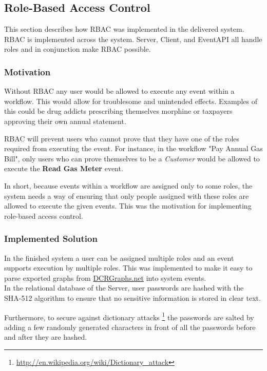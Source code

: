 \subsection{\label{sec:RBAC}Role-Based Access Control}
This section describes how RBAC was implemented in the delivered system. RBAC is implemented across the system. Server, Client, and EventAPI all handle roles and in conjunction make RBAC possible.

\subsubsection{Motivation}
Without RBAC any user would be allowed to execute any event within a workflow. This would allow for troublesome and unintended effects. Examples of this could be drug addicts prescribing themselves morphine or taxpayers approving their own annual statement. 

RBAC will prevent users who cannot prove that they have one of the roles required from executing the event. For instance, in the workflow "Pay Annual Gas Bill", only users who can prove themselves to be a \textit{Customer} would be allowed to execute the \textbf{Read Gas Meter} event.

In short, because events within a workflow are assigned only to some roles, the system needs a way of ensuring that only people assigned with these roles are allowed to execute the given events. This was the motivation for implementing role-based access control. 

\subsubsection{Implemented Solution}
In the finished system a user can be assigned multiple roles and an event supports execution by multiple roles. This was implemented to make it easy to parse exported graphs from \url{DCRGraphs.net} into system events. \\

In the relational database of the Server, user passwords are hashed with the SHA-512 algorithm to ensure that no sensitive information is stored in clear text. 

Furthermore, to secure against dictionary attacks \footnote{\url{http://en.wikipedia.org/wiki/Dictionary_attack}} the passwords are salted by adding a few randomly generated characters in front of all the passwords before and after they are hashed.\\

